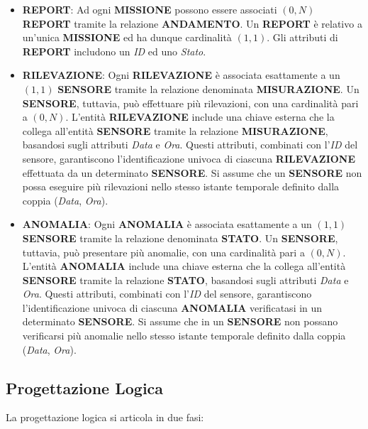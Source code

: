 \begin{itemize}
    \item \textbf{REPORT}: Ad ogni \textbf{MISSIONE} possono essere associati $(0,N)$ \textbf{REPORT} tramite la relazione \textbf{ANDAMENTO}. Un \textbf{REPORT} è relativo a un'unica \textbf{MISSIONE} ed ha dunque cardinalità $(1,1)$. Gli attributi di \textbf{REPORT} includono un \textit{ID} ed uno \textit{Stato}.
    
    \item \textbf{RILEVAZIONE}: Ogni \textbf{RILEVAZIONE} è associata esattamente a un $(1,1)$ \textbf{SENSORE} tramite la relazione denominata \textbf{MISURAZIONE}. Un \textbf{SENSORE}, tuttavia, può effettuare più rilevazioni, con una cardinalità pari a $(0,N)$. L'entità \textbf{RILEVAZIONE} include una chiave esterna che la collega all'entità \textbf{SENSORE} tramite la relazione \textbf{MISURAZIONE}, basandosi sugli attributi \textit{Data} e \textit{Ora}. Questi attributi, combinati con l'\textit{ID} del sensore, garantiscono l’identificazione univoca di ciascuna \textbf{RILEVAZIONE} effettuata da un determinato \textbf{SENSORE}. Si assume che un \textbf{SENSORE} non possa eseguire più rilevazioni nello stesso istante temporale definito dalla coppia (\textit{Data}, \textit{Ora}).
    
    \item \textbf{ANOMALIA}: Ogni \textbf{ANOMALIA} è associata esattamente a un $(1,1)$ \textbf{SENSORE} tramite la relazione denominata \textbf{STATO}. Un \textbf{SENSORE}, tuttavia, può presentare più anomalie, con una cardinalità pari a $(0,N)$. L'entità \textbf{ANOMALIA} include una chiave esterna che la collega all'entità \textbf{SENSORE} tramite la relazione \textbf{STATO}, basandosi sugli attributi \textit{Data} e \textit{Ora}. Questi attributi, combinati con l'\textit{ID} del sensore, garantiscono l’identificazione univoca di ciascuna \textbf{ANOMALIA} verificatasi in un determinato \textbf{SENSORE}. Si assume che in un \textbf{SENSORE} non possano verificarsi più anomalie nello stesso istante temporale definito dalla coppia (\textit{Data}, \textit{Ora}).
\end{itemize}


\subsection{Progettazione Logica}

La progettazione logica si articola in due fasi:


